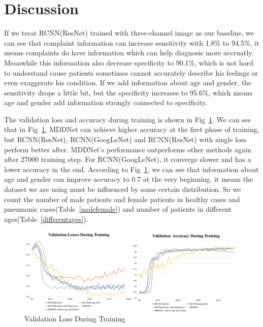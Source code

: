\documentclass[journal]{IEEEtran}
\begin{document}
\section{Discussion}
\label{discuss}
If we treat RCNN(ResNet) trained with three-channel image as our baseline, we can see that complaint information can increase sensitivity with 1.8\% to 94.5\%, it means complaints do have information which can help diagnosis more accruatly. Meanwhile this information also decrease specificity to 90.1\%, which is not hard to understand cause patients sometimes cannot accurately describe his feelings or even exaggerate his condition. If we add information about age and gender, the sensitivity drops a little bit, but the specificity increases to 95.6\%, which means age and gender add information strongly connected to specificity.

The validation loss and accuracy during training is shown in Fig~\ref{loss}. We can see that in Fig~\ref{loss}, MDDNet can achieve higher accuracy at the first phase of training, but RCNN(ResNet), RCNN(GoogLeNet) and RCNN(ResNet) with single loss perform better after. MDDNet's performance outperforms other methods again after 27000 training step. For RCNN(GoogLeNet), it converge slower and has a lower accuracy in the end. According to Fig~\ref{loss}, we can see that information about age and gender can improve accuracy to 0.7 at the very beginning, it means the dataset we are using must be influenced by some certain distribution. So we count the number of male patients and female patients in healthy cases and pneumonic cases(Table~\ref{malefemale}) and number of patients in different ages(Table~\ref{differentages}). 


\begin{figure}[t]
    \centerline{\includegraphics[width=200mm]{losses.pdf}}
    \vspace{-0cm}
    \caption{Validation Loss During Training}
    \vspace{-0cm}
    \label{loss}
    \end{figure}
\end{document}
